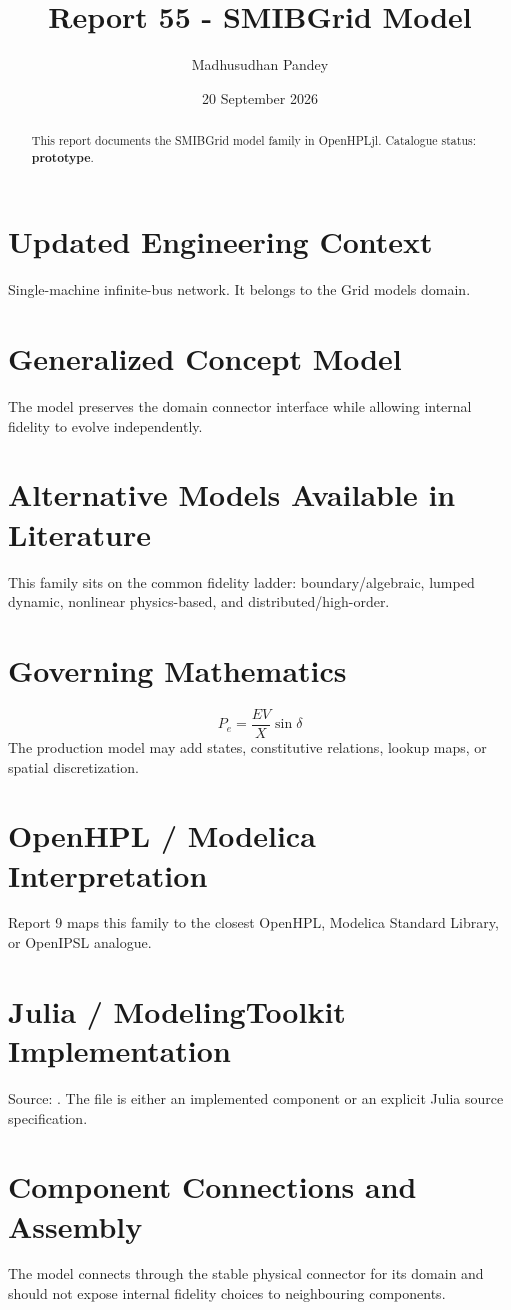 \documentclass[10pt,a4paper]{article}
\title{Report 55 - SMIBGrid Model}
\author{Madhusudhan Pandey}
\date{20 September 2026}
\begin{document}
\maketitle
\begin{abstract}This report documents the SMIBGrid model family in OpenHPLjl. Catalogue status: \textbf{prototype}.\end{abstract}
\section{Updated Engineering Context}Single-machine infinite-bus network. It belongs to the Grid models domain.
\section{Generalized Concept Model}The model preserves the domain connector interface while allowing internal fidelity to evolve independently.
\section{Alternative Models Available in Literature}This family sits on the common fidelity ladder: boundary/algebraic, lumped dynamic, nonlinear physics-based, and distributed/high-order.
\section{Governing Mathematics}\[P_e=\frac{EV}{X}\sin\delta\]The production model may add states, constitutive relations, lookup maps, or spatial discretization.
\section{OpenHPL / Modelica Interpretation}Report 9 maps this family to the closest OpenHPL, Modelica Standard Library, or OpenIPSL analogue.
\section{Julia / ModelingToolkit Implementation}Source: \texttt{}. The file is either an implemented component or an explicit Julia source specification.
\section{Component Connections and Assembly}The model connects through the stable physical connector for its domain and should not expose internal fidelity choices to neighbouring components.
\end{document}
